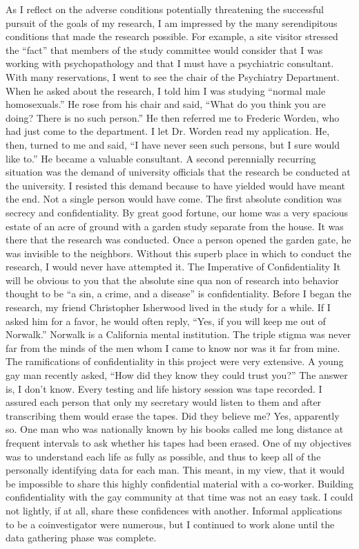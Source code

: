 As I reflect on the adverse conditions potentially threatening the successful pursuit of the goals of my research, I am impressed by the many serendipitous conditions that made the research possible. For example, a site visitor stressed the ``fact'' that members of the study committee would consider that I was working with psychopathology and that I must have a psychiatric consultant. With many reservations, I went to see the chair of the Psychiatry Department. When he asked about the research, I told him I was studying ``normal male homosexuals.'' He rose from his chair and said, ``What do you think you are doing? There is no such person.'' He then referred me to Frederic Worden, who had just come to the department. I let Dr. Worden read my application. He, then, turned to me and said, ``I have never seen such persons, but I sure would like to.'' He became a valuable consultant.
A second perennially recurring situation was the demand of university officials that the research be conducted at the university. I resisted this demand because to have yielded would have meant the end. Not a single person would have come. The first absolute condition was secrecy and confidentiality. By great good fortune, our home was a very spacious estate of an acre of ground with a garden study separate from the house. It was there that the research was conducted. Once a person opened the garden gate, he was invisible to the neighbors. Without this superb place in which to conduct the research, I would never have attempted it.
The Imperative of Confidentiality
It will be obvious to you that the absolute sine qua non of research into behavior thought to be ``a sin, a crime, and a disease'' is confidentiality. Before I began the research, my friend Christopher Isherwood lived in the study for a while. If I asked him for a favor, he would often reply, ``Yes, if you will keep me out of Norwalk.'' Norwalk is a California mental institution. The triple stigma was never far from the minds of the men whom I came to know nor was it far from mine.
The ramifications of confidentiality in this project were very extensive. A young gay man recently asked, ``How did they know they could trust you?'' The answer is, I don't know. Every testing and life history session was tape recorded. I assured each person that only my secretary would listen to them and after transcribing them would erase the tapes. Did they believe me? Yes, apparently so. One man who was nationally known by his books called me long distance at frequent intervals to ask whether his tapes had been erased.
One of my objectives was to understand each life as fully as possible, and thus to keep all of the personally identifying data for each man. This meant, in my view, that it would be impossible to share this highly confidential material with a co-worker. Building confidentiality with the gay community at that time was not an easy task. I could not lightly, if at all, share these confidences with another. Informal applications to be a coinvestigator were numerous, but I continued to work alone until the data gathering phase was complete.
